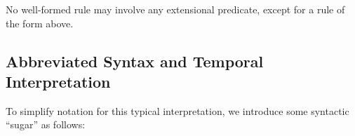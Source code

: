 \vspace{1.2em}
No well-formed \lang rule may involve any extensional predicate, except for a rule of the form above.

\subsection{Abbreviated Syntax and Temporal Interpretation}

\label{sec:abbrvsyntax}



To simplify \lang notation for this typical interpretation, we
introduce some syntactic ``sugar'' as follows:

